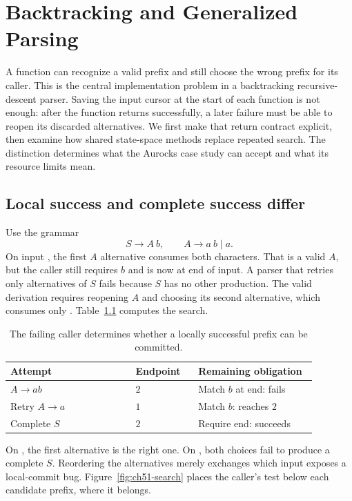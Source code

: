 \chapter{Backtracking and Generalized Parsing}
\label{ch:backtracking-generalized}

A function can recognize a valid prefix and still choose the wrong prefix for its caller.
This is the central implementation problem in a backtracking recursive-descent parser.
Saving the input cursor at the start of each function is not enough: after the function returns successfully, a later failure must be able to reopen its discarded alternatives.
We first make that return contract explicit, then examine how shared state-space methods replace repeated search.
The distinction determines what the Aurocks case study can accept and what its resource limits mean.

\section{Local success and complete success differ}
\label{sec:ch51-local}

Use the grammar
\[
 S\to A\ b,\qquad A\to a\ b\mid a.
\]
On input , the first $A$ alternative consumes both characters.
That is a valid $A$, but the caller still requires $b$ and is now at end of input.
A parser that retries only alternatives of $S$ fails because $S$ has no other production.
The valid derivation requires reopening $A$ and choosing its second alternative, which consumes only .
Table~\ref{tab:ch51-retry} computes the search.

\begin{table}[htbp]
\caption{The failing caller determines whether a locally successful prefix can be committed.}
\label{tab:ch51-retry}
\centering
\begin{tabular}{p{0.36\linewidth}p{0.18\linewidth}p{0.34\linewidth}}
\toprule
Attempt & Endpoint & Remaining obligation \\
\midrule
$A\to ab$ & $2$ & Match $b$ at end: fails \\
Retry $A\to a$ & $1$ & Match $b$: reaches $2$ \\
Complete $S$ & $2$ & Require end: succeeds \\
\bottomrule
\end{tabular}
\end{table}

On , the first alternative is the right one.
On , both choices fail to produce a complete $S$.
Reordering the alternatives merely exchanges which input exposes a local-commit bug.
Figure~\ref{fig:ch51-search} places the caller's test below each candidate prefix, where it belongs.

